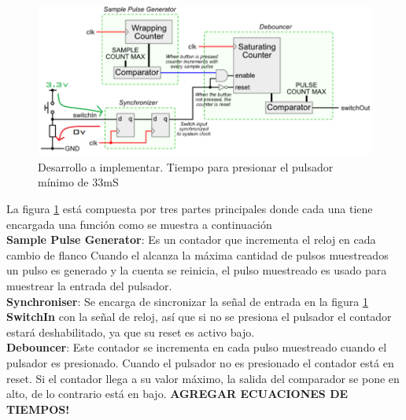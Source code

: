 \documentclass[paper=a4, fontsize=12pt]{article} 		%
\numberwithin{equation}{section}						%
\numberwithin{table}{section} 							%
\begin{document}
\begin{figure}[H]
  \centering
     \includegraphics[width=1\textwidth]{implementacion}
  \caption{Desarrollo a implementar. Tiempo para presionar el pulsador mínimo de 33mS}
  \label{fig:eliteimplemetacion}
\end{figure}
La figura \ref{fig:eliteimplemetacion} está compuesta por tres partes principales donde cada una tiene encargada una función como se muestra  a continuación\\
\newline
\textbf{Sample Pulse Generator}: Es un contador que incrementa el reloj en cada cambio de flanco Cuando el alcanza la máxima cantidad de pulsos muestreados un pulso es generado y la cuenta se reinicia, el pulso muestreado es usado para muestrear la entrada del pulsador.\\
\newline
\textbf{Synchroniser}: Se encarga de sincronizar la señal de entrada en la figura \ref{fig:eliteimplemetacion} \textbf{SwitchIn} con la señal de reloj, así que si no se presiona el pulsador el contador estará deshabilitado, ya que su reset es activo bajo.\\
\newline
\textbf{Debouncer}: Este contador se incrementa en cada pulso muestreado cuando el pulsador es presionado. Cuando el pulsador no es presionado el contador está en reset. Si el contador llega a su valor máximo, la salida del comparador se pone en alto, de lo contrario está en bajo.
\textbf{AGREGAR ECUACIONES DE TIEMPOS!}
\newline
\end{document}
